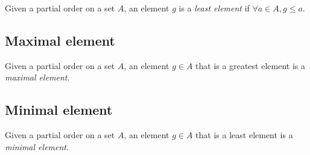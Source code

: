 \documentclass{article}
\begin{document}
Given a partial order on a set \(A\), an element \(g\) is a \textit{least element}
if \(\forall a\in A, g \leq a\).

\subsection{Maximal element}

Given a partial order on a set \(A\), an element \(g\in A\) that is
a greatest element is a \textit{maximal element}.

\subsection{Minimal element}

Given a partial order on a set \(A\), an element \(g\in A\) that is
a least element is a \textit{minimal element}.

\pagebreak
\end{document}

